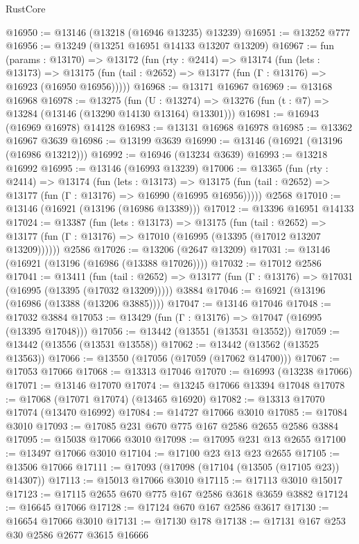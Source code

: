 \begin{lexlean}{RustCore}
\begin{coremodule}
@16950 := @13146 (@13218 (@16946 @13235) @13239)
@16951 := @13252 @777
@16956 := @13249 (@13251 @16951 @14133 @13207 @13209)
@16967 := fun (params : @13170) =>
  @13172
    (fun (rty : @2414) =>
    @13174
      (fun (lets : @13173) =>
      @13175 (fun (tail : @2652) => @13177 (fun (Γ : @13176) => @16923 (@16950 @16956)))))
@16968 := @13171 @16967
@16969 := @13168 @16968
@16978 := @13275
    (fun (U : @13274) => @13276 (fun (t : @7) => @13284 (@13146 (@13290 @14130 @13164) @13301)))
@16981 := @16943 (@16969 @16978) @14128
@16983 := @13131 @16968 @16978
@16985 := @13362 @16967 @3639
@16986 := @13199 @3639
@16990 := @13146 (@16921 (@13196 (@16986 @13212)))
@16992 := @16946 (@13234 @3639)
@16993 := @13218 @16992
@16995 := @13146 (@16993 @13239)
@17006 := @13365
    (fun (rty : @2414) =>
    @13174
      (fun (lets : @13173) =>
      @13175 (fun (tail : @2652) => @13177 (fun (Γ : @13176) => @16990 (@16995 @16956)))))
    @2568
@17010 := @13146 (@16921 (@13196 (@16986 @13389)))
@17012 := @13396 @16951 @14133
@17024 := @13387
    (fun (lets : @13173) =>
    @13175
      (fun (tail : @2652) =>
      @13177 (fun (Γ : @13176) => @17010 (@16995 (@13395 (@17012 @13207 @13209))))))
    @2586
@17026 := @13206 (@2647 @13209)
@17031 := @13146 (@16921 (@13196 (@16986 (@13388 @17026))))
@17032 := @17012 @2586
@17041 := @13411
    (fun (tail : @2652) => @13177 (fun (Γ : @13176) => @17031 (@16995 (@13395 (@17032 @13209)))))
    @3884
@17046 := @16921 (@13196 (@16986 (@13388 (@13206 @3885))))
@17047 := @13146 @17046
@17048 := @17032 @3884
@17053 := @13429 (fun (Γ : @13176) => @17047 (@16995 (@13395 @17048)))
@17056 := @13442 (@13551 (@13531 @13552))
@17059 := @13442 (@13556 (@13531 @13558))
@17062 := @13442 (@13562 (@13525 @13563))
@17066 := @13550 (@17056 (@17059 (@17062 @14700)))
@17067 := @17053 @17066
@17068 := @13313 @17046
@17070 := @16993 (@13238 @17066)
@17071 := @13146 @17070
@17074 := @13245 @17066 @13394 @17048
@17078 := @17068 (@17071 @17074) (@13465 @16920)
@17082 := @13313 @17070 @17074 (@13470 @16992)
@17084 := @14727 @17066 @3010
@17085 := @17084 @3010
@17093 := @17085 @231 @670 @775 @167 @2586 @2655 @2586 @3884
@17095 := @15038 @17066 @3010
@17098 := @17095 @231 @13 @2655
@17100 := @13497 @17066 @3010
@17104 := @17100 @23 @13 @23 @2655
@17105 := @13506 @17066
@17111 := @17093 (@17098 (@17104 (@13505 (@17105 @23)) @14307))
@17113 := @15013 @17066 @3010
@17115 := @17113 @3010 @15017
@17123 := @17115 @2655 @670 @775 @167 @2586 @3618 @3659 @3882
@17124 := @16645 @17066
@17128 := @17124 @670 @167 @2586 @3617
@17130 := @16654 @17066 @3010
@17131 := @17130 @178
@17138 := @17131 @167 @253 @30 @2586 @2677 @3615 @16666

\end{coremodule}
\end{lexlean}
